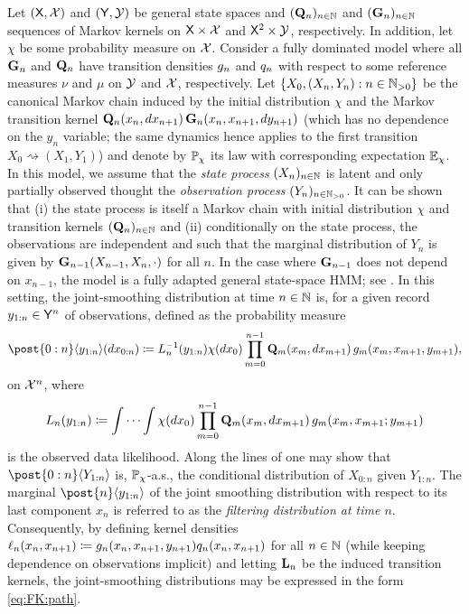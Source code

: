\begin{example}
\label{ex:state-space:models}
Let $(\mathsf{X}, \mathcal{X})$ and $(\mathsf{Y}, \mathcal{Y})$ be general state spaces and $(\mathbf{Q}_n)_{n \in \mathbb{N}}$ and $(\mathbf{G}_n)_{n \in \mathbb{N}}$ sequences of Markov kernels on $\mathsf{X} \times \mathcal{X}$ and $\mathsf{X}^2 \times \mathcal{Y}$, respectively. In addition, let $\chi$ be some probability measure on $\mathcal{X}$. Consider a fully dominated model where all $\mathbf{G}_n$ and $\mathbf{Q}_n$ have transition densities $g_{n}$ and $q_{n}$ with respect to some reference measures $\nu$ and $\mu$ on $\mathcal{Y}$ and $\mathcal{X}$, respectively. Let $\{X_0, (X_n, Y_n) : n \in \mathbb{N}_{> 0}\}$ be the canonical Markov chain induced by the initial distribution $\chi$ and the Markov transition kernel $\mathbf{Q}_n(x_n, d x_{n + 1}) \, \mathbf{G}_n(x_n, x_{n + 1}, d y_{n + 1})$ (which has no dependence on the $y_n$ variable; the same dynamics hence applies to the first transition $X_0 \rightsquigarrow (X_1, Y_1)$) and denote by $\mathbb{P}_\chi$ its law with corresponding expectation $\mathbb{E}_\chi$. In this model, we assume that the \emph{state process} $(X_n)_{n \in \mathbb{N}}$ is latent and only partially observed thought the \emph{observation process} $(Y_n)_{n \in \mathbb{N}_{> 0}}$. It can be shown that (i) the state process is itself a Markov chain with initial distribution $\chi$ and transition kernels $(\mathbf{Q}_n)_{n \in \mathbb{N}}$ and (ii) conditionally on the state process, the observations are independent and such that the marginal distribution of $Y_n$ is given by $\mathbf{G}_{n - 1}(X_{n - 1}, X_n, \cdot)$ for all $n$. In the case where $\mathbf{G}_{n - 1}$ does not depend on $x_{n - 1}$, the model is a fully adapted general state-space HMM; see \cite[Section~2.2]{Cappe:2005:IHM:1088883}. In this setting, the joint-smoothing distribution at time $n \in \mathbb{N}$ is, for a given record $y_{1:n} \in \mathsf{Y}^n$ of observations, defined as the probability measure  
\begin{equation}
\label{eq:smooth}
    \post{0:n} \langle y_{1:n} \rangle (\rmd x_{0:n}) \eqdef \llh{n}^{-1}(y_{1:n}) \chi(\rmd x_0) \prod_{m = 0}^{n - 1} \hk_m(x_m, \rmd x_{m + 1}) \, \md{m}(x_m, x_{m + 1}, y_{m + 1}), 
\end{equation}
on $\mathcal{X}^n$, where   
\begin{equation}
    \label{eq:likelihood}
    \llh{n}(y_{1:n}) \eqdef \idotsint \chi(\rmd x_0) \prod_{m = 0}^{n - 1} \hk_m(x_m, \rmd x_{m + 1}) \, \md{m}(x_m, x_{m + 1}; y_{m + 1})
\end{equation}
is the observed data likelihood. Along the lines of \cite[Proposition~3.1.4]{Cappe:2005:IHM:1088883} one may show that $\post{0:n} \langle Y_{1:n} \rangle$ is, $\mathbb{P}_\chi$-a.s., the conditional distribution of $X_{0:n}$ given $Y_{1:n}$. The marginal  $\post{n} \langle y_{1:n} \rangle$ of the joint smoothing distribution with respect to its last component $x_n$ is referred to as the \emph{filtering distribution at time $n$}. Consequently, by defining kernel densities $\ell_{n}(x_n, x_{n + 1}) \coloneqq g_{n}(x_n, x_{n + 1}, y_{n + 1}) q_{n}(x_n, x_{n + 1})$ for all $n \in \mathbb{N}$ (while keeping dependence on observations implicit) and letting $\mathbf{L}_{n}$ be the induced transition kernels, the joint-smoothing distributions may be expressed in the form \eqref{eq:FK:path}.
\end{example}


